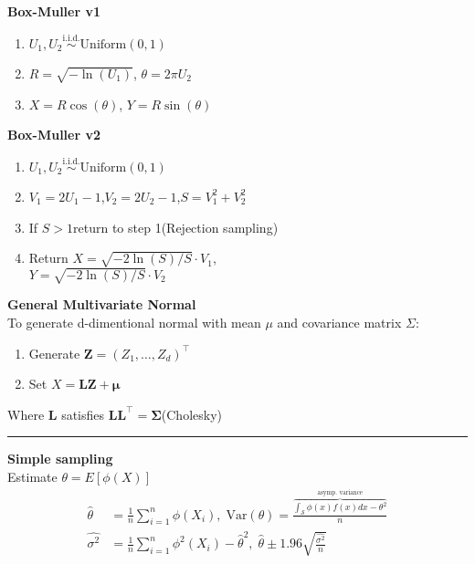 \documentclass[10pt]{article} %
\begin{document}
\begin{multicols}{4}
{\begin{flushleft}
            \textbf{Box-Muller v1}
            \begin{enumerate}
                \item \(U_1,U_2 \overset{\text{i.i.d.}}{\sim} \text{Uniform}(0,1)\)
                \item \(R = \sqrt{-\ln(U_1)}\), \(\theta = 2\pi U_2\)
                \item \(X = R\cos(\theta)\), \(Y = R\sin(\theta)\)
            \end{enumerate}
            \textbf{Box-Muller v2}
            \begin{enumerate}
                \item \(U_1,U_2 \overset{\text{i.i.d.}}{\sim} \text{Uniform}(0,1)\)
                \item \(V_1 = 2U_1-1\),\(V_2 = 2U_2-1\),\(S=V_1^2+V_2^2\)
                \item If \(S>1\)return to step 1(Rejection sampling)
                \item Return \(X=\sqrt{-2\ln(S)/S} \cdot V_1\), \\
                      \(Y=\sqrt{-2\ln(S)/S} \cdot V_2\)
            \end{enumerate}
            \textbf{General Multivariate Normal}\\
            To generate d-dimentional normal with mean \(\mu\) and covariance matrix
            \(\Sigma\):
            \begin{enumerate}
                \item Generate \(\mathbf{Z} = (Z_1,\dots,Z_d)^{\top}\)
                \item Set \(X=\mathbf{LZ} + \boldsymbol{\mu}\)
            \end{enumerate}
            Where \(\mathbf{L}\) satisfies \(\mathbf{LL^{\top}=\Sigma}\)(Cholesky)
            \hrule
            \vspace{0.1cm}
            \textbf{Simple sampling}\\
            Estimate \(\theta = E[\phi(X)]\)
            {\small
                    \begin{align*}
                        \hat{\theta}   & = \frac{1}{n}\sum_{i=1}^{n}\phi(X_i),\;\text{Var}(\theta) = \frac{\overbrace{\int_{\mathcal{S}}\phi(x)f(x)dx-\theta^2}^{\text{asymp. variance}}}{n} \\
                        \hat{\sigma^2} & = \frac{1}{n} \sum_{i=1}^{n}\phi^2(X_i)-\hat{\theta}^2, \;\hat{\theta} \pm 1.96 \sqrt{\frac{\hat{\sigma^2}}{n}}
                    \end{align*}
}
\end{flushleft}}
\end{multicols}
\end{document}
